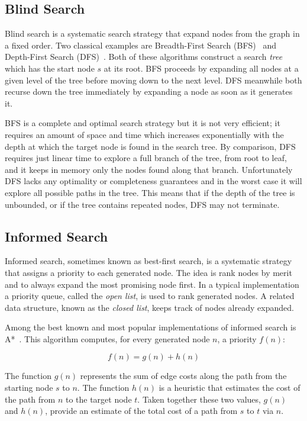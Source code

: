 \subsection{Blind Search}
\label{cha::lit::search::blind}
Blind search is a systematic search strategy that expand nodes from the 
graph in a fixed order. Two classical examples are Breadth-First Search (BFS)~\citep{moore59}
and Depth-First Search (DFS)~\citep{russel03}. 
Both of these algorithms construct a search \emph{tree} which has the start node 
$s$ at its root. BFS proceeds by expanding all nodes at a given level of the tree
before moving down to the next level. DFS meanwhile both recurse down the 
tree immediately by expanding a node as soon as it generates it.

BFS is a complete and optimal search strategy but it is not very efficient; it requires
an amount of space and time which increases exponentially with the depth at which 
the target node is found in the search tree.
By comparison, DFS requires just linear time to explore a full branch of the tree, 
from root to leaf, and it keeps in memory only the nodes found along that branch. 
Unfortunately DFS lacks any optimality or completeness guarantees and in the worst 
case it will explore all possible paths in the tree. This means that if the depth of 
the tree is unbounded, or if the tree contains repeated nodes, DFS may not terminate. 

\subsection{Informed Search}
\label{cha::lit::search::informed}
Informed search, sometimes known as best-first search, is a systematic strategy
that assigns a priority to each generated node. The idea is rank nodes by merit 
and to always expand the most promising node first.
In a typical implementation a priority queue, called the 
\emph{open list}, is used to rank generated nodes. A related data structure, 
known as the \emph{closed list}, keeps track of nodes already expanded.

Among the best known and most popular implementations of informed search is 
A*~\citep{hart68}. This algorithm computes, for every generated node $n$, a 
priority $f(n)$:

\begin{equation}
f(n) = g(n) + h(n)
\end{equation}

The function $g(n)$ represents the sum of edge costs along the path from the
starting node $s$ to $n$. The function $h(n)$ is a heuristic that estimates the
cost of the path from $n$ to the target node $t$.  Taken together these two
values, $g(n)$ and $h(n)$, provide an estimate of the total cost of a path from
$s$ to $t$ via $n$.  

